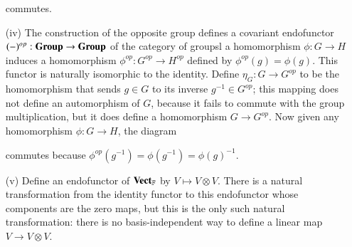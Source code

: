 \documentclass[12pt, a4paper, oneside, openright, titlepage]{book}
\begin{document}
\begin{eg}
\begin{enumerate}
            \begin{center}
        \end{center}
            commutes.
        \item[(iv)] The construction of the opposite group defines a covariant endofunctor $(-)^{op}:\normalfont\textbf{Group}\rightarrow \normalfont\textbf{Group}$ of the category of groupsl a homomorphism $\phi:G\rightarrow H$ induces a homomorphism $\phi^{op}:G^{op}\rightarrow H^{op}$ defined by $\phi^{op}(g) = \phi(g)$. This functor is naturally isomorphic to the identity. Define $\eta_G:G\rightarrow G^{op}$ to be the homomorphism that sends $g \in G$ to its inverse $g^{-1} \in G^{op}$; this mapping does not define an automorphism of $G$, because it fails to commute with the group multiplication, but it does define a homomorphism $G\rightarrow G^{op}$. Now given any homomorphism $\phi:G\rightarrow H$, the diagram
            \begin{center}
        \end{center}
            commutes because $\phi^{op}(g^{-1}) = \phi(g^{-1}) = \phi(g)^{-1}$.
        \item[(v)] Define an endofunctor of $\normalfont\textbf{Vect}_{\mathbb{F}}$ by $V\mapsto V\otimes V$. There is a natural transformation from the identity functor to this endofunctor whose components are the zero maps, but this is the only such natural transformation: there is no basis-independent way to define a linear map $V\rightarrow V\otimes V$. 
    \end{enumerate}
\end{eg}
\end{document}
